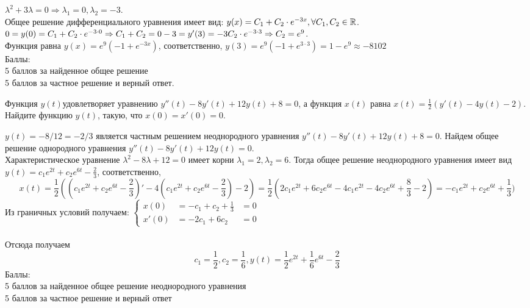 \documentclass[addpoints, answers]{exam} %
\begin{document}
\begin{questions}
   \begin{solution}
$\lambda^2+3\lambda=0 \Rightarrow \lambda_1=0, \lambda_2=-3.$ \\
Общее решение дифференциального уравнения имеет вид: $y(x)=C_1+C_2\cdot e^{-3x}, \forall C_1,C_2 \in \mathbb R$.\\
$0=y(0)=C_1+C_2\cdot e^{-3\cdot 0} \Rightarrow C_1+C_2=0\\
-3=y'(3)=-3C_2\cdot e^{-3\cdot 3}\Rightarrow C_2=e^9$.\\
 Функция равна $y(x)=e^9(-1+e^{-3x})$, соответственно, $y(3)=e^9(-1+e^{3\cdot3})=1-e^9\approx -8102$\\
Баллы:\\
5 баллов за найденное общее решение\\
5 баллов за частное решение и верный ответ.
   \end{solution}

\question[10] Функция $y(t)$удовлетворяет уравнению $y''(t)-8y'(t)+12y(t)+8=0$, а функция $x(t)$ равна $x(t)=\frac{1}{2}(y'(t)-4y(t)-2)$. Найдите функцию  $y(t)$, такую, что $x(0)=x'(0)=0$.\\

   \begin{solution}
$y(t)=-8/12=-2/3$ является частным решением неоднородного уравнения $y''(t)-8y'(t)+12y(t)+8=0$. Найдем общее решение однородного уравнения $y''(t)-8y'(t)+12y(t)=0$.\\
Характеристическое уравнение $\lambda^2-8\lambda+12=0$ имеет корни $\lambda_1=2, \lambda_2=6$. Тогда общее решение неоднородного уравнения имеет вид $y(t)=c_1e^{2t}+c_2e^{6t}-\frac{2}{3}$, соответственно,
\[
x(t)=\frac{1}{2}\left((c_1e^{2t}+c_2e^{6t}-\frac{2}{3})'-4(c_1e^{2t}+c_2e^{6t}-\frac{2}{3})-2\right)=\frac{1}{2}(2c_1e^{2t}+6c_2e^{6t}-4c_1e^{2t}-4c_2e^{6t}+\frac{8}{3}-2)=-c_1e^{2t}+c_2e^{6t}+\frac{1}{3})
\]
Из граничных условий получаем: $\left\{\begin{aligned}
x(0) &=-c_1+c_2+\frac{1}{3}&=0\\
x'(0)&=-2c_1+6c_2 &=0
\end{aligned}\right.$\\\\
Отсюда получаем 
\[
c_1=\frac{1}{2}, c_2=\frac{1}{6}, y(t)=\frac{1}{2}e^{2t}+\frac{1}{6}e^{6t}-\frac{2}{3}
\]
Баллы:\\
5 баллов за найденное общее решение неоднородного уравнения\\
5 баллов за частное решение и верный ответ
   \end{solution}


\end{questions}
\end{document}
